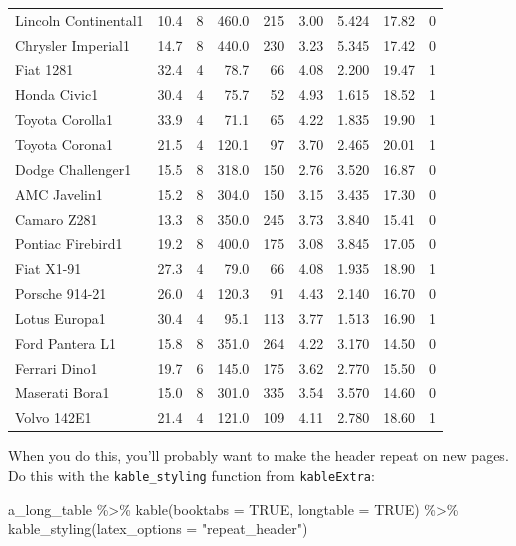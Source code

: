 \documentclass[a4paper, twoside]{templates/ociamthesis}
\newenvironment{Shaded}{\begin{snugshade}}{\end{snugshade}}
\newcommand{\AttributeTok}[1]{\textcolor[rgb]{0.77,0.63,0.00}{#1}}
\newcommand{\ConstantTok}[1]{\textcolor[rgb]{0.00,0.00,0.00}{#1}}
\newcommand{\FunctionTok}[1]{\textcolor[rgb]{0.00,0.00,0.00}{#1}}
\newcommand{\NormalTok}[1]{#1}
\newcommand{\SpecialCharTok}[1]{\textcolor[rgb]{0.00,0.00,0.00}{#1}}
\newcommand{\StringTok}[1]{\textcolor[rgb]{0.31,0.60,0.02}{#1}}
\renewenvironment{Shaded}
{
  \vspace{10pt}%
  \begin{snugshade}%
}{%
  \end{snugshade}%
  \vspace{8pt}%
}
\begin{document}
\begin{longtable}{lrrrrrrrr}
Lincoln Continental1 & 10.4 & 8 & 460.0 & 215 & 3.00 & 5.424 & 17.82 & 0\\
Chrysler Imperial1 & 14.7 & 8 & 440.0 & 230 & 3.23 & 5.345 & 17.42 & 0\\
Fiat 1281 & 32.4 & 4 & 78.7 & 66 & 4.08 & 2.200 & 19.47 & 1\\
\addlinespace
Honda Civic1 & 30.4 & 4 & 75.7 & 52 & 4.93 & 1.615 & 18.52 & 1\\
Toyota Corolla1 & 33.9 & 4 & 71.1 & 65 & 4.22 & 1.835 & 19.90 & 1\\
Toyota Corona1 & 21.5 & 4 & 120.1 & 97 & 3.70 & 2.465 & 20.01 & 1\\
Dodge Challenger1 & 15.5 & 8 & 318.0 & 150 & 2.76 & 3.520 & 16.87 & 0\\
AMC Javelin1 & 15.2 & 8 & 304.0 & 150 & 3.15 & 3.435 & 17.30 & 0\\
\addlinespace
Camaro Z281 & 13.3 & 8 & 350.0 & 245 & 3.73 & 3.840 & 15.41 & 0\\
Pontiac Firebird1 & 19.2 & 8 & 400.0 & 175 & 3.08 & 3.845 & 17.05 & 0\\
Fiat X1-91 & 27.3 & 4 & 79.0 & 66 & 4.08 & 1.935 & 18.90 & 1\\
Porsche 914-21 & 26.0 & 4 & 120.3 & 91 & 4.43 & 2.140 & 16.70 & 0\\
Lotus Europa1 & 30.4 & 4 & 95.1 & 113 & 3.77 & 1.513 & 16.90 & 1\\
\addlinespace
Ford Pantera L1 & 15.8 & 8 & 351.0 & 264 & 4.22 & 3.170 & 14.50 & 0\\
Ferrari Dino1 & 19.7 & 6 & 145.0 & 175 & 3.62 & 2.770 & 15.50 & 0\\
Maserati Bora1 & 15.0 & 8 & 301.0 & 335 & 3.54 & 3.570 & 14.60 & 0\\
Volvo 142E1 & 21.4 & 4 & 121.0 & 109 & 4.11 & 2.780 & 18.60 & 1\\
\bottomrule
\end{longtable}

When you do this, you'll probably want to make the header repeat on new pages.
Do this with the \texttt{kable\_styling} function from \texttt{kableExtra}:

\begin{Shaded}
\begin{Highlighting}[]
\NormalTok{a\_long\_table }\SpecialCharTok{\%\textgreater{}\%} 
  \FunctionTok{kable}\NormalTok{(}\AttributeTok{booktabs =} \ConstantTok{TRUE}\NormalTok{, }\AttributeTok{longtable =} \ConstantTok{TRUE}\NormalTok{) }\SpecialCharTok{\%\textgreater{}\%} 
  \FunctionTok{kable\_styling}\NormalTok{(}\AttributeTok{latex\_options =} \StringTok{"repeat\_header"}\NormalTok{)}
\end{Highlighting}
\end{Shaded}
\end{document}
